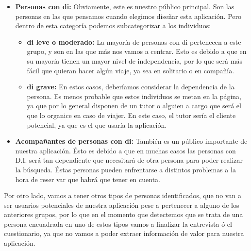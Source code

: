 \begin{itemize}
    \item \textbf{Personas con \gls{di}:} Obviamente, este es nuestro público principal. Son las personas en las que pensamos cuando
            elegimos diseñar esta aplicación. Pero dentro de esta categoría podemos subcategorizar a los individuos:
            \begin{itemize}
                \item \textbf{\gls{di} leve o moderado:} La mayoría de personas con \gls{di} pertenecen a este grupo, y son en las que más nos vamos a centrar.
                        Esto es debido a que en su mayoría tienen un mayor nivel de independencia, por lo que será más fácil que quieran hacer algún viaje, ya
                        sea en solitario o en compañía.
                \item \textbf{\gls{di} grave:} En estos casos, deberíamos considerar la dependencia de la persona. Es menos probable que estos individuos
                        se metan en la página, ya que por lo general disponen de un tutor o alguien a cargo que será el que lo organice en caso de viajer. En
                        este caso, el tutor sería el cliente potencial, ya que es el que usaría la aplicación. 
            \end{itemize}
    \item \textbf{Acompañantes de personas con \gls{di}:} También es un público importante de nuestra aplicación. Ésto es debido a que en muchas casos las personas con
            D.I. será tan dependiente que necesitará de otra persona para poder realizar la búsqueda. Éstas personas pueden enfrentarse a distintos problemas
            a la hora de reser var que habrá que tener en cuenta.
\end{itemize}

Por otro lado, vamos a tener otros tipos de personas identificados, que no van a ser usuarios potenciales de nuestra aplicación pese a pertenecer a 
alguno de los anteriores grupos, por lo que en el momento que detectemos que se trata de una persona encuadrada en uno de estos tipos
vamos a finalizar la entrevista ó el cuestionario, ya que no vamos a poder extraer información de valor para nuestra aplicación.


